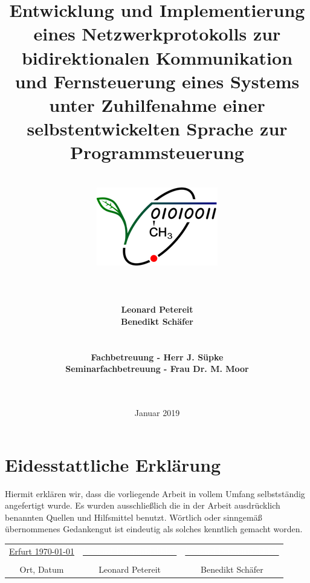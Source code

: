 \documentclass[12pt,a4paper]{scrartcl}
\begin{document}
\title{Entwicklung und Implementierung eines Netzwerkprotokolls zur bidirektionalen Kommunikation und Fernsteuerung eines Systems unter Zuhilfenahme einer selbstentwickelten Sprache zur Programmsteuerung}
\date{Januar 2019}
\author{\hfill\\ 
\includegraphics[scale=2.5]{logo}\hfill\\\hfill\\\hfill\\\hfill\\\textbf{Leonard Petereit}\\\textbf{Benedikt Schäfer}\\\hfill\\\hfill\\
\textbf{Fachbetreuung - Herr J. Süpke}\\
\textbf{Seminarfachbetreuung - Frau Dr. M. Moor}
\hfill\\\hfill\\\hfill\\
}
\clearpage\maketitle
\thispagestyle{empty}
\newpage
\tableofcontents
\thispagestyle{empty}

\newpage

\setcounter{page}{1}


\newpage



\newpage



\newpage



\newpage

\newpage
\section* {Eidesstattliche Erklärung}

\thispagestyle{empty}

Hiermit erklären wir, dass die vorliegende Arbeit in vollem Umfang selbstständig angefertigt wurde. 
Es wurden ausschließlich die in der Arbeit ausdrücklich benannten Quellen und Hilfsmittel benutzt. 
Wörtlich oder sinngemäß übernommenes Gedankengut ist eindeutig als solches kenntlich gemacht worden.

\vspace{1cm}
\begin{tabular}{c c c}
\underline{Erfurt \today} & \underline{\textcolor{white}{Leonard Petereitblahblah}} & \underline{\textcolor{white}{Leonard Petereitblahblah}}\\\\
Ort, Datum & Leonard Petereit & Benedikt Schäfer\\
\end{tabular}
\end{document}
